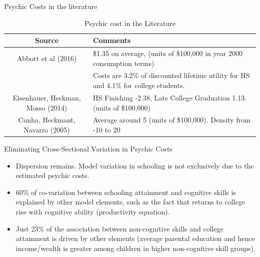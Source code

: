 \documentclass{beamer}
\begin{document}
\begin{frame}{Psychic Costs in the literature}

\begin{table}[H]
\caption {Psychic cost in the Literature} \label{tab:title} 
\begin{center}
  \begin{tabular}{c |  l     }
      \hline
Source & Comments \\\hline

\tiny{Abbott et al (2016)} &\tiny{\$1.35 on average, (units of \$100,000 in year 2000 consumption terms)}  \\

&\tiny{Costs are 3.2\% of discounted lifetime utility for HS and 4.1\% for college students.}  \\\hline

\tiny{Eisenhauer, Heckman, Mosso (2014)} &\tiny{ HS Finishing -2.38, Late College Graduation 1.13. (units of \$100,000)}  \\\hline
\tiny{Cunha, Heckmant, Navarro (2005)} &\tiny{Average around 5 (units of \$100,000). Density from -10 to 20}  \\\hline

\end{tabular}
\end{center}
\end{table}


\end{frame}


\begin{frame}[label=Return6]{Eliminating Cross-Sectional Variation in Psychic Costs}
\hyperlink{Psychic1}{}

\begin{itemize}
\item Dispersion remains. Model variation in schooling is not exclusively due to the estimated psychic costs.
\item 60\% of co-variation between schooling attainment and cognitive skills is explained by other model elements, such as the fact that returns to college rise with cognitive ability (productivity equation).
\item Just 23\% of the association between non-cognitive skills and college attainment is driven by other elements (average parental education and hence income/wealth is greater among children in higher non-cognitive skill groups).

\end{itemize}

\end{frame}
\end{document}
